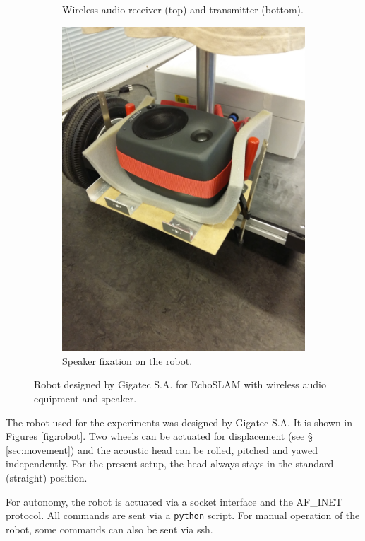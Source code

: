 \begin{figure}
\begin{subfigure}{0.3\linewidth}
        \caption{Wireless audio receiver (top) and transmitter (bottom).}
        \label{fig:audio}
    \end{subfigure}
    \hspace{0.5em}
    \begin{subfigure}{0.3\linewidth}
        \centering
        \includegraphics[height=0.3\textheight]{files/Speaker.jpg}
        \caption{Speaker fixation on the robot.}
        \label{fig:speaker}
    \end{subfigure}
    \caption{Robot designed by Gigatec S.A. for EchoSLAM with wireless audio equipment and speaker.}
\end{figure}

The robot used for the experiments was designed by Gigatec S.A. It is shown in Figures \ref{fig:robot}. 
Two wheels can be actuated for displacement (see § \ref{sec:movement}) and the acoustic head can be rolled, pitched and yawed independently. 
For the present setup, the head always stays in the standard (straight) position.

For autonomy, the robot is actuated via a socket interface and the AF\_INET protocol. All commands are sent via a \texttt{python} script. For manual operation of the robot, some commands can also be sent via ssh.
